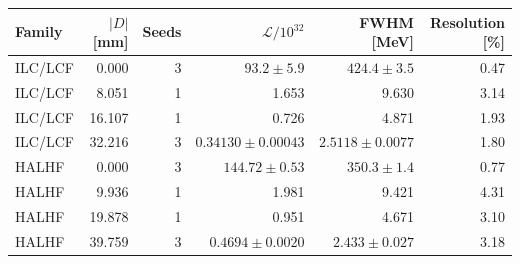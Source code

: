 \begin{tabular}{@{}lrrrrr@{}}
\toprule
Family & $|D|$ [mm] & Seeds & $\mathcal L/10^{32}$ & FWHM [MeV] & Resolution [\%]\\
\midrule
ILC/LCF & 0.000 & 3 & $93.2\pm5.9$ & $424.4\pm3.5$ & 0.47\\
ILC/LCF & 8.051 & 1 & 1.653 & 9.630 & 3.14\\
ILC/LCF & 16.107 & 1 & 0.726 & 4.871 & 1.93\\
ILC/LCF & 32.216 & 3 & $0.34130\pm0.00043$ & $2.5118\pm0.0077$ & 1.80\\
HALHF & 0.000 & 3 & $144.72\pm0.53$ & $350.3\pm1.4$ & 0.77\\
HALHF & 9.936 & 1 & 1.981 & 9.421 & 4.31\\
HALHF & 19.878 & 1 & 0.951 & 4.671 & 3.10\\
HALHF & 39.759 & 3 & $0.4694\pm0.0020$ & $2.433\pm0.027$ & 3.18\\
\bottomrule
\end{tabular}
